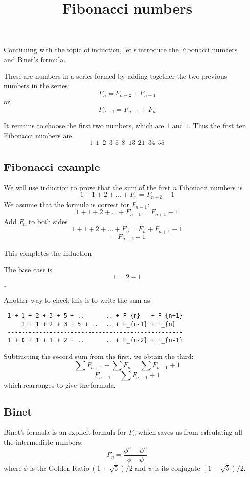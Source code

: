 \documentclass[11pt, oneside]{article}
\title{Fibonacci numbers}
\date{}
\begin{document}
\maketitle
\Large

\label{sec:fibonacci}

Continuing with the topic of induction, let's introduce the Fibonacci numbers and Binet's formula.  

These are numbers in a series formed by adding together the two previous numbers in the series:
\[ F_n = F_{n-2} + F_{n-1} \]
or
\[ F_{n+1} = F_{n-1} + F_{n} \]

It remains to choose the first two numbers, which are $1$ and $1$.  Thus the first ten Fibonacci numbers are
\[ 1 \ \  1 \ \   2 \ \   3  \ \  5  \ \  8 \ \   13 \ \   21 \ \   34 \ \   55 \]

\subsection*{Fibonacci example}

We will use induction to prove that the sum of the first $n$ Fibonacci numbers is
\[ 1 + 1 + 2 + \dots + F_n = F_{n+2} - 1 \]
We assume that the formula is correct for $F_{n - 1}$:
\[ 1 + 1 + 2 + \dots + F_{n-1} = F_{n+1} - 1 \]
Add $F_{n}$ to both sides
\[ 1 + 1 + 2 + \dots + F_{n} = F_{n} + F_{n+1} - 1 \]
\[ = F_{n+2} - 1 \]

This completes the induction.

The base case is 
\[ 1 = 2 - 1 \]

$\square$

Another way to check this is to write the sum as

\begin{verbatim}
 1 + 1 + 2 + 3 + 5 + ..      .. + F_{n}   + F_{n+1}
     1 + 1 + 2 + 3 + 5 + ..  .. + F_{n-1} + F_{n}
 --------------------------------------------------
 1 + 0 + 1 + 1 + 2 + ..      .. + F_{n-2} + F_{n-1}
\end{verbatim}

Subtracting the second sum from the first, we obtain the third:
\[ \sum F_{n+1} - \sum F_n =  \sum F_{n-1} + 1  \]
\[ F_{n+1}  =  \sum F_{n-1} + 1  \]
which rearranges to give the formula.

\subsection*{Binet}

Binet's formula is an explicit formula for $F_n$ which saves us from calculating all the intermediate numbers:
\[ F_n = \frac{\phi^n - \psi^n}{\phi - \psi} \]
where $\phi$ is the Golden Ratio $(1 + \sqrt{5})/2$ and $\psi$ is its conjugate $(1 - \sqrt{5})/2$.
\end{document}
